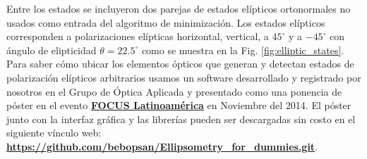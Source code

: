 Entre los estados se incluyeron dos parejas de estados
elípticos ortonormales no usados
como entrada del algoritmo de minimización. Los estados elípticos
corresponden a polarizaciones elípticas horizontal, vertical, a
$45^{\circ}$ y a $-45^{\circ}$ con ángulo de elipticidad $\theta
=22.5^{\circ}$ como se muestra en la Fig. \ref{fig:elliptic_states}.
\\
Para saber cómo ubicar los
elementos ópticos que generan y detectan estados de polarización
elípticos arbitrarios usamos un software desarrollado y registrado por nosotros en el Grupo de
Óptica Aplicada y presentado como una ponencia de póster en el evento
\href{http://www.eafit.edu.co/focuslatinoamerica2014/Paginas/Inicio.aspx}{\textbf{FOCUS
    Latinoamérica}} en Noviembre del 2014. El póster junto con la
interfaz gráfica y las librerías pueden ser descargadas sin costo en
el siguiente vínculo web:\\
\hspace*{\fill}
\href{https://github.com/bebopsan/Ellipsometry\_for\_dummies.git}{\textbf{https://github.com/bebopsan/Ellipsometry\_for\_dummies.git}}\hspace*{\fill}.\\


